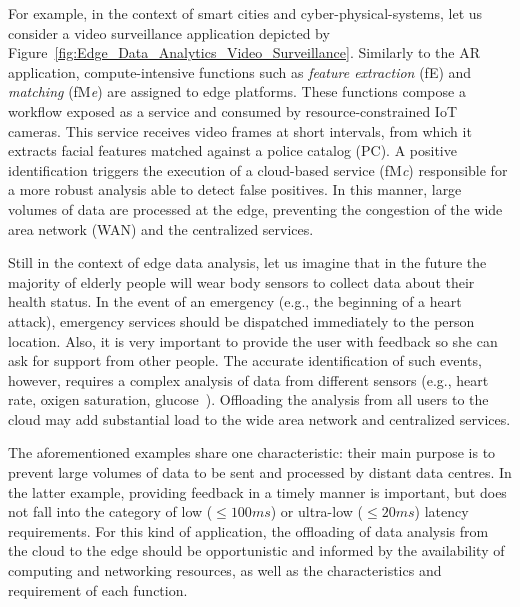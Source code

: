 For example, in the context of smart cities and cyber-physical-systems, let us consider a video surveillance application depicted by Figure~\ref{fig:Edge_Data_Analytics_Video_Surveillance}. Similarly to the AR application, compute-intensive functions such as \textit{feature extraction} (fE) and \textit{matching} (fM\textit{e}) are assigned to edge platforms.
These functions compose a workflow exposed as a service and consumed by resource-constrained IoT cameras. This service receives video frames at short intervals, from which it extracts facial features matched against a police catalog (PC). A positive identification triggers the execution of a cloud-based service (fM\textit{c}) responsible for a more robust analysis able to detect false positives. In this manner, large volumes of data are processed at the edge, preventing the congestion of the wide area network (WAN) and the centralized services.



Still in the context of edge data analysis, 
let us imagine that in the future the majority of elderly people will wear body sensors to collect data about their health status. In the event of an emergency (e.g., the beginning of a heart attack), emergency services should be dispatched immediately to the person location. Also, it is very important to provide the user with feedback so she can ask for support from other people.
The accurate identification of such events, however, requires a complex analysis of data from different sensors (e.g., heart rate, oxigen saturation, glucose~\cite{Li:2017}). Offloading the analysis from all users to the cloud may add substantial load to the wide area network and centralized services. %

The aforementioned examples share one characteristic: their main purpose is to prevent large volumes of data to be sent and processed by distant data centres. In the latter example, providing feedback in a timely manner is important, but does not fall into the category of low ($\leq 100ms$) or ultra-low ($\leq 20ms$) latency requirements. For this kind of application, the offloading of data analysis from the cloud to the edge should be opportunistic and informed by the availability of computing and networking resources, as well as the characteristics and requirement of each function.


